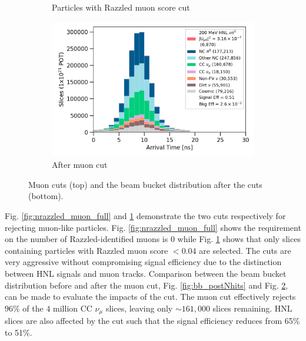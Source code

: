 \begin{figure}[b!]
\begin{subfigure}[b]{0.495\textwidth}
            \caption{Particles with Razzled muon score cut}%
            \label{fig:razzled_muon_score_full}
        \end{subfigure}
        \hfill
	\centering
        \begin{subfigure}[b]{0.495\textwidth}   
            \centering 
            \includegraphics[width=\textwidth]{beam_bucket_postmuon}
            \caption{After muon cut}%
            \label{fig:bb_post_muon}
        \end{subfigure}
        \caption{
		Muon cuts (top) and the beam bucket distribution after the cuts (bottom). 
	}
        \label{fig:razzled_muon_cut}
\end{figure}

Fig. \ref{fig:nrazzled_muon_full} and \ref{fig:razzled_muon_score_full} demonstrate the two cuts respectively for rejecting muon-like particles.
Fig. \ref{fig:nrazzled_muon_full} shows the requirement on the number of Razzled-identified muons is 0 while Fig. \ref{fig:razzled_muon_score_full} shows that only slices containing particles with Razzled muon score $< 0.04$ are selected.
The cuts are very aggressive without compromising signal efficiency due to the distinction between HNL signals and muon tracks.  
Comparison between the beam bucket distribution before and after the muon cut, Fig. \ref{fig:bb_postNhits} and Fig. \ref{fig:bb_post_muon}, can be made to evaluate the impacts of the cut.
The muon cut effectively rejects $96\%$ of the $4$ million CC $\nu_\mu$ slices, leaving only $\sim161,000$ slices remaining.
HNL slices are also affected by the cut such that the signal efficiency reduces from 65\% to 51\%.

